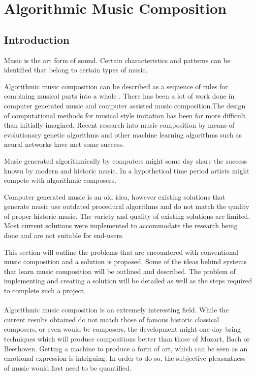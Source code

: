 \chapter{Algorithmic Music Composition}
\section{Introduction}
Music is the art form of sound. Certain characteristics and patterns can be identified that belong to certain types of music.

Algorithmic music composition can be described as a sequence of rules for combining musical parts into a whole \cite{Tanaka1993}.
There has been a lot of work done in computer generated music and computer assisted music composition.The design of computational methods for musical style imitation has been far more difficult than initially imagined.
Recent research into music composition by means of evolutionary genetic algorithms and other machine learning algorithms such as neural networks have met some success.

Music generated algorithmically by computers might some day share the success known by modern and historic music. In a hypothetical time period artists might compete with algorithmic composers.

Computer generated music is an old idea, however existing solutions that generate music use outdated procedural algorithms and do not match the quality of proper historic music. The variety and quality of existing solutions are limited. Most current solutions were implemented to accommodate the research being done and are not suitable for end-users.

This section will outline the problems that are encountered with conventional music composition and a solution is proposed. Some of the ideas behind systems that learn music composition will be outlined and described. The problem of implementing and creating a solution will be detailed as well as the steps required to complete such a project.
\\
\\
Algorithmic music composition is an extremely interesting field. While the current results obtained do not match those of famous historic classical composers, or even would-be composers, the development might one day bring techniques which will produce compositions better than those of Mozart, Bach or Beethoven. Getting a machine to produce a form of art, which can be seen as an emotional expression is intriguing. In order to do so, the subjective pleasantness of music would first need to be quantified. 

